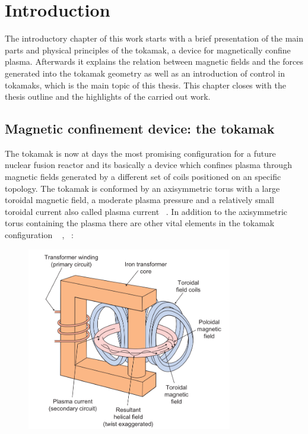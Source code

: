 \chapter{Introduction}

The introductory chapter of this work starts with a brief presentation of the main parts  and physical principles of the tokamak, a device for magnetically confine plasma. Afterwards it  explains the relation between magnetic fields and the forces generated into the tokamak geometry  as well as an introduction of control in tokamaks, which is the main topic of this thesis. This chapter closes with the thesis outline and the highlights of the carried out work. 

\section{Magnetic confinement device: the tokamak}

The tokamak is now at days the most promising configuration for a future nuclear fusion reactor and its basically a device which confines plasma through magnetic fields generated by a different set of coils positioned on an specific topology.  The tokamak is conformed by an axisymmetric torus with a large toroidal magnetic field, a moderate plasma pressure and a relatively small toroidal current also called plasma current ~\cite[Chapter~13]{Freidberg2007}. In addition to the axisymmetric torus containing the plasma there are other vital elements in the tokamak configuration ~\cite[Chapter~1]{Song2014} , ~\cite[Chapter~1]{Wesson2004}: \smallskip

\begin{figure}[h]
	\centering
	\includegraphics[width=0.8\textwidth]{Chp1/Tokamak_parts.png}
	\caption{ ~\cite{McCracken2005} \label{Tkmk_parts}}
\end{figure}

